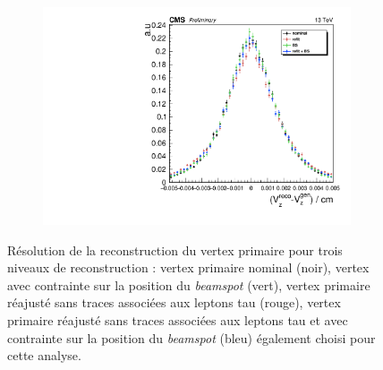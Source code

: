 \begin{figure}
\begin{subfigure}[b]{0.33\linewidth}
    \includegraphics[width=\linewidth]{Chapitre7/Images/PVz.pdf} 
    \caption{} 
    \vspace{0.5ex}
  \end{subfigure} 
    \caption{Résolution de la reconstruction du vertex primaire pour trois niveaux de reconstruction : vertex primaire nominal (noir), vertex avec contrainte sur la position du \textit{beamspot} (vert), vertex primaire réajusté sans traces associées aux leptons tau (rouge), vertex primaire réajusté sans traces associées aux leptons tau et avec contrainte sur la position du \textit{beamspot} (bleu) également choisi pour cette analyse.}
    \label{PVreso}
\end{figure}

